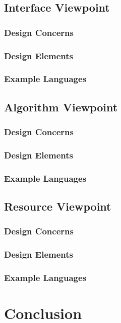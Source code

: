\documentclass[onecolumn, draftclsnofoot,10pt, compsoc]{IEEEtran}
\begin{document}
\subsection{Interface Viewpoint}
\subsubsection{Design Concerns}

\subsubsection{Design Elements}

\subsubsection{Example Languages}

\subsection{Algorithm Viewpoint}
\subsubsection{Design Concerns}

\subsubsection{Design Elements}

\subsubsection{Example Languages}

\subsection{Resource Viewpoint}
\subsubsection{Design Concerns}

\subsubsection{Design Elements}

\subsubsection{Example Languages}

\section{Conclusion}
\end{document}
